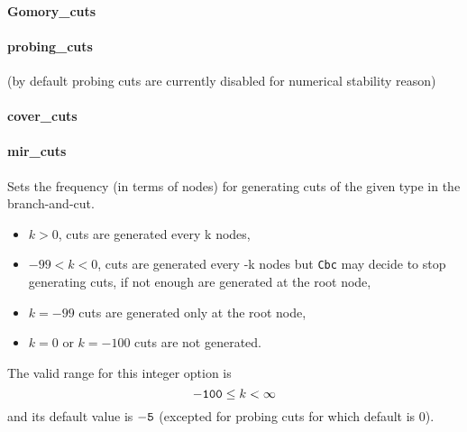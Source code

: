 \paragraph{Gomory\_cuts}
\paragraph{probing\_cuts}(by default probing cuts are currently disabled for numerical stability reason)
\paragraph{cover\_cuts}
\paragraph{mir\_cuts}
Sets the frequency (in terms of nodes) for generating cuts of
the given type in the branch-and-cut.
\begin{itemize}
\item $k > 0$, cuts are generated every k nodes,
\item $-99 < k < 0$,  cuts are generated every -k nodes but
{\tt Cbc} may decide to stop generating cuts, if not
enough are generated at the root node,
\item$k = -99$ cuts are generated only at the root node,
\item $k = 0$ or $k = -100$ cuts are not generated.
\end{itemize}
 The valid range for this integer option is
$${\tt -100} \le k <  \infty$$
and its default value is ${\tt -5}$ (excepted for probing
cuts for which default is 0).
